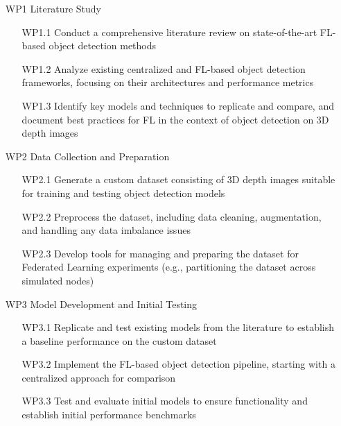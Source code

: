 \documentclass[thesis]{mas_proposal}
\begin{document}
\begin{enumerate}

      \item[WP1] Literature Study
            \begin{itemize}
                  \item[WP1.1] Conduct a comprehensive literature review on state-of-the-art FL-based object detection methods
                  \item[WP1.2] Analyze existing centralized and FL-based object detection frameworks, focusing on their architectures and performance metrics
                  \item[WP1.3] Identify key models and techniques to replicate and compare, and document best practices for FL in the context of object detection on 3D depth images
            \end{itemize}

      \item[WP2] Data Collection and Preparation
            \begin{itemize}
                  \item[WP2.1] Generate a custom dataset consisting of 3D depth images suitable for training and testing object detection models
                  \item[WP2.2] Preprocess the dataset, including data cleaning, augmentation, and handling any data imbalance issues
                  \item[WP2.3] Develop tools for managing and preparing the dataset for Federated Learning experiments (e.g., partitioning the dataset across simulated nodes)
            \end{itemize}

      \item[WP3] Model Development and Initial Testing
            \begin{itemize}
                  \item[WP3.1] Replicate and test existing models from the literature to establish a baseline performance on the custom dataset
                  \item[WP3.2] Implement the FL-based object detection pipeline, starting with a centralized approach for comparison
                  \item[WP3.3] Test and evaluate initial models to ensure functionality and establish initial performance benchmarks
            \end{itemize}


\end{enumerate}
\end{document}
